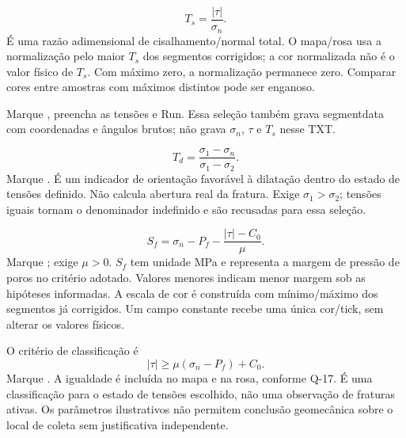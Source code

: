 \begin{equation}T_s=\frac{|\tau|}{\sigma_n}.\end{equation}
É uma razão adimensional de cisalhamento/normal total. O mapa/rosa usa a normalização pelo maior \(T_s\) dos segmentos corrigidos; a cor normalizada não é o valor físico de \(T_s\). Com máximo zero, a normalização permanece zero. Comparar cores entre amostras com máximos distintos pode ser enganoso.

Marque , preencha as tensões e Run. Essa seleção também grava segmentdata com coordenadas e ângulos brutos; não grava \(\sigma_n\), \(\tau\) e \(T_s\) nesse TXT.

\begin{equation}T_d=\frac{\sigma_1-\sigma_n}{\sigma_1-\sigma_2}.\end{equation}
Marque . É um indicador de orientação favorável à dilatação dentro do estado de tensões definido. Não calcula abertura real da fratura. Exige \(\sigma_1>\sigma_2\); tensões iguais tornam o denominador indefinido e são recusadas para essa seleção.

\begin{equation}S_f=\sigma_n-P_f-\frac{|\tau|-C_0}{\mu}.\end{equation}
Marque ; exige \(\mu>0\). \(S_f\) tem unidade MPa e representa a margem de pressão de poros no critério adotado. Valores menores indicam menor margem sob as hipóteses informadas. A escala de cor é construída com mínimo/máximo dos segmentos já corrigidos. Um campo constante recebe uma única cor/tick, sem alterar os valores físicos.

O critério de classificação é
\begin{equation}|\tau|\geq\mu(\sigma_n-P_f)+C_0.\label{eq:csf}\end{equation}
Marque . A igualdade é incluída no mapa e na rosa, conforme Q-17. É uma classificação para o estado de tensões escolhido, não uma observação de fraturas ativas. Os parâmetros ilustrativos não permitem conclusão geomecânica sobre o local de coleta sem justificativa independente.

